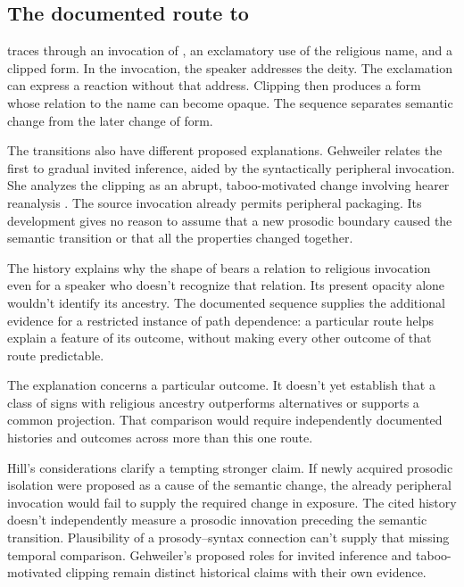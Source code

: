 \documentclass[12pt]{article}
\begin{document}
\subsection{The documented route to }

\textcite{gehweiler2008} traces  through an invocation of ,
an exclamatory use of the religious name, and a clipped form. In the invocation, the speaker addresses the deity.
The exclamation can express a reaction without that address. Clipping
then produces a form whose relation to the name can become opaque.
The sequence separates semantic change from the later change of form.

The transitions also have different proposed explanations. Gehweiler
relates the first to gradual invited inference, aided by the syntactically
peripheral invocation. She analyzes the clipping as an abrupt, taboo-motivated
change involving hearer reanalysis \citep[84--88]{gehweiler2008}. The
source invocation already permits peripheral packaging. Its development
gives no reason to assume that a new prosodic boundary caused
the semantic transition or that all the properties changed together.

The history explains why the shape of  bears a relation
to religious invocation even for a speaker who doesn't recognize that
relation. Its present opacity alone wouldn't identify its ancestry.
The documented sequence supplies the additional evidence for a
restricted instance of path dependence: a particular route helps explain
a feature of its outcome, without making every other outcome of that
route predictable.

The explanation concerns a particular outcome. It doesn't yet establish
that a class of signs with religious ancestry outperforms alternatives
or supports a common projection. That comparison would require independently
documented histories and outcomes across more than this one route.

Hill's considerations clarify a tempting stronger claim. If newly acquired
prosodic isolation were proposed as a cause of the semantic change, the
already peripheral invocation would fail to supply the required change
in exposure. The cited history doesn't independently measure a prosodic
innovation preceding the semantic transition. Plausibility of a
prosody--syntax connection can't supply that missing temporal comparison.
Gehweiler's proposed roles for invited inference and taboo-motivated
clipping remain distinct historical claims with their own evidence.
\end{document}
